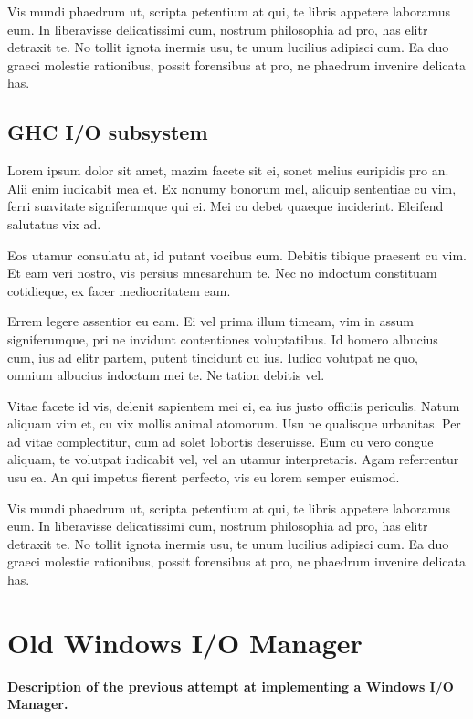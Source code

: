 \documentclass[a4paper,11pt,oneside]{report}
\begin{document}
Vis mundi phaedrum ut, scripta petentium at qui, te libris appetere laboramus
eum. In liberavisse delicatissimi cum, nostrum philosophia ad pro, has elitr
detraxit te. No tollit ignota inermis usu, te unum lucilius adipisci cum. Ea duo
graeci molestie rationibus, possit forensibus at pro, ne phaedrum invenire
delicata has.

\section{GHC I/O subsystem}

Lorem ipsum dolor sit amet, mazim facete sit ei, sonet melius euripidis pro
an. Alii enim iudicabit mea et. Ex nonumy bonorum mel, aliquip sententiae cu
vim, ferri suavitate signiferumque qui ei. Mei cu debet quaeque
inciderint. Eleifend salutatus vix ad.

Eos utamur consulatu at, id putant vocibus eum. Debitis tibique praesent cu
vim. Et eam veri nostro, vis persius mnesarchum te. Nec no indoctum constituam
cotidieque, ex facer mediocritatem eam.

Errem legere assentior eu eam. Ei vel prima illum timeam, vim in assum
signiferumque, pri ne invidunt contentiones voluptatibus. Id homero albucius
cum, ius ad elitr partem, putent tincidunt cu ius. Iudico volutpat ne quo,
omnium albucius indoctum mei te. Ne tation debitis vel.

Vitae facete id vis, delenit sapientem mei ei, ea ius justo officiis
periculis. Natum aliquam vim et, cu vix mollis animal atomorum. Usu ne qualisque
urbanitas. Per ad vitae complectitur, cum ad solet lobortis deseruisse. Eum cu
vero congue aliquam, te volutpat iudicabit vel, vel an utamur
interpretaris. Agam referrentur usu ea. An qui impetus fierent perfecto, vis eu
lorem semper euismod.

Vis mundi phaedrum ut, scripta petentium at qui, te libris appetere laboramus
eum. In liberavisse delicatissimi cum, nostrum philosophia ad pro, has elitr
detraxit te. No tollit ignota inermis usu, te unum lucilius adipisci cum. Ea duo
graeci molestie rationibus, possit forensibus at pro, ne phaedrum invenire
delicata has.


\chapter{Old Windows I/O Manager}

\textbf{Description of the previous attempt at implementing a Windows I/O
  Manager.}
\end{document}
